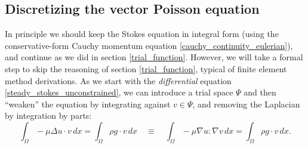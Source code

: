 \subsection{Discretizing the vector Poisson equation}\label{discretizing_vector_poisson}
In principle we should keep the Stokes equation
in integral form (using the conservative-form Cauchy momentum equation \eqref{cauchy_continuity_eulerian}), and continue as we did
in section \ref{trial_function}. However,
we will take a formal step to skip the reasoning of section \ref{trial_function}, typical of finite element method derivations.
As we start with the \textit{differential} equation \eqref{steady_stokes_unconstrained}, we can introduce a trial space $\Psi$ and then ``weaken''
the equation by integrating against $v \in \Psi$, and removing the Laplacian by integration by parts:
\begin{equation}\label{steady_stokes_unconstrained_weak}
    \int_\Omega -\mu\Delta u\cdot v\,dx = \int_\Omega \rho g\cdot v\,dx
    \quad\equiv\quad
    \int_\Omega -\mu\nabla u : \nabla v\,dx = \int_\Omega \rho g\cdot v\,dx.
\end{equation}

